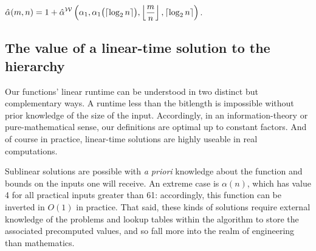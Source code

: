 \begin{thm}
	$\displaystyle \hat{\alpha}(m, n) = 1 + \hat{\alpha}^{\mathcal{W}}\left(\alpha_1, \alpha_1\big(\lceil\log_2n \rceil\big), \left\lfloor \frac{m}{n} \right\rfloor, \lceil\log_2n \rceil \right)$.
\end{thm}

\subsection{The value of a linear-time solution to the hierarchy}

Our functions' linear runtime can be understood in two distinct but
complementary ways.  A runtime less than the bitlength is impossible 
without prior knowledge of the size of the input.  Accordingly, in
an information-theory or pure-mathematical sense, our definitions are
optimal up to constant factors.  And of course in practice, linear-time 
solutions are highly useable in real computations.

Sublinear solutions are possible with \emph{a priori} knowledge about
the function and bounds on the inputs one will receive.
An extreme case is $\alpha(n)$, which has value 4 for all practical 
inputs greater than 61: accordingly, 
this function can be inverted in $O(1)$ in practice.  That said, these 
kinds of solutions require external knowledge of the problems and
lookup tables within the algorithm to store the associated precomputed 
values, and so fall more into the realm of engineering than mathematics.

